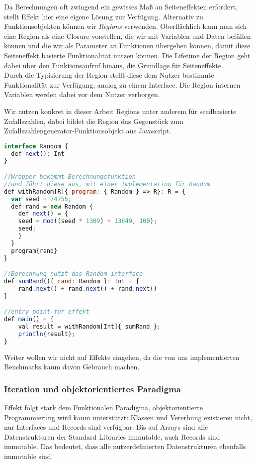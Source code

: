 Da Berechnungen oft zwingend ein gewisses Maß an Seiteneffekten erfordert, stellt Effekt hier eine eigene Lösung zur Verfügung.
Alternativ zu Funktionsobjekten können wir \textit{Regions} verwenden. Oberflächlich kann man sich eine Region als eine Closure vorstellen, die wir mit Variablen und Daten befüllen können und die wir als Parameter an Funktionen übergeben können, damit diese Seiteneffekt basierte Funktionalität nutzen können. Die Lifetime der Region geht dabei über den Funktionsaufruf hinaus, die Grundlage für Seiteneffekte.\\
Durch die Typisierung der Region stellt diese dem Nutzer bestimmte Funktionalität zur Verfügung, analog zu einem Interface. Die Region internen Variablen werden dabei vor dem Nutzer verborgen.

Wir nutzen konkret in dieser Arbeit Regions unter anderem für seedbasierte Zufallszahlen, dabei bildet die Region das Gegenstück zum Zufallszahlengenerator-Funktionsobjekt aus Javascript.

\begin{lstlisting}[language=JavaScript]
interface Random {
  def next(): Int
}

//Wrapper bekommt Berechnungsfunktion
//und führt diese aus, mit einer Implementation für Random
def withRandom[R]{ program: { Random } => R}: R = {
  var seed = 74755;
  def rand = new Random {
    def next() = {
    seed = mod((seed * 1309) + 13849, 100);
    seed;
    }
  }
  program{rand}
}

//Berechnung nutzt das Random interface
def sumRand(){ rand: Random }: Int = {
    rand.next() + rand.next() + rand.next()
}

//entry point für effekt
def main() = {
    val result = withRandom[Int]{ sumRand };
    println(result);
}
\end{lstlisting}

Weiter wollen wir nicht auf Effekte eingehen, da die von uns implementierten Benchmarks kaum davon Gebrauch machen.

\subsubsection{ Iteration und objektorientiertes Paradigma }

Effekt folgt stark dem Funktionalen Paradigma, objektorientierte Programmierung wird kaum unterstützt:
Klassen und Vererbung existieren nicht, nur Interfaces und Records sind verfügbar.
Bis auf Arrays sind alle Datenstrukturen der Standard Libraries immutable, auch Records sind immutable. Das bedeutet, dass alle nutzerdefinierten Datenstrukturen ebenfalls immutable sind.

